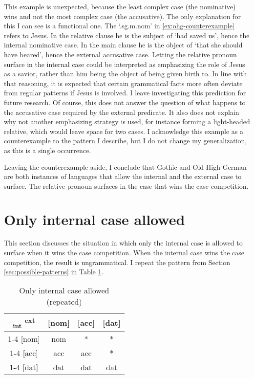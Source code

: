 This example is unexpected, because the least complex case (the nominative) wins and not the most complex case (the accusative).
The only explanation for this I can see is a functional one. The  `.\ac{sg}.\ac{m}.\ac{nom}' in \ref{ex:ohg-counterexample} refers to Jesus. In the relative clause he is the subject of  `had saved us', hence the internal nominative case. In the main clause he is the object of  `that she should have beared', hence the external accusative case.
Letting the relative pronoun surface in the internal case could be interpreted as emphasizing the role of Jesus as a savior, rather than him being the object of being given birth to. In line with that reasoning, it is expected that certain grammatical facts more often deviate from regular patterns if Jesus is involved. I leave investigating this prediction for future research.
Of course, this does not answer the question of what happens to the accusative case required by the external predicate. It also does not explain why not another emphasizing strategy is used, for instance forming a light-headed relative, which would leave space for two cases.
I acknowledge this example as a counterexample to the pattern I describe, but I do not change my generalization, as this is a single occurrence.

Leaving the counterexample aside, I conclude that Gothic and Old High German are both instances of languages that allow the internal and the external case to surface. The relative pronoun surfaces in the case that wins the case competition.


\section{Only internal case allowed}\label{sec:pattern-ii}

This section discusses the situation in which only the internal case is allowed to surface when it wins the case competition. When the internal case wins the case competition, the result is ungrammatical. I repeat the pattern from Section \ref{sec:possible-patterns} in Table \ref{tbl:case-competition-only-int-repeated}.

\begin{table}[ht]
  \center
  \caption{Only internal case allowed (repeated)}
  \begin{tabular}{c|c|c|c}
    \toprule
    \textsubscript{\ac{int}} \textsuperscript{\ac{ext}}
           & [\ac{nom}]
           & [\ac{acc}]
           & [\ac{dat}]
           \\ \cmidrule{1-4}
       [\ac{nom}]
           & \ac{nom}
           & *
           & *
           \\ \cmidrule{1-4}
       [\ac{acc}]
           & \ac{acc}
           & \ac{acc}
           & *
           \\ \cmidrule{1-4}
       [\ac{dat}]
           & \ac{dat}
           & \ac{dat}
           & \ac{dat}
           \\
     \bottomrule
  \end{tabular}
    \label{tbl:case-competition-only-int-repeated}
\end{table}

